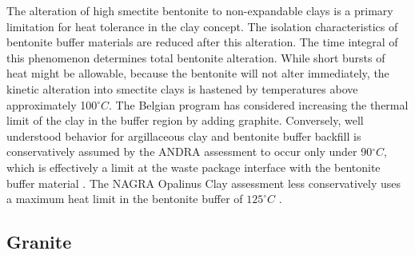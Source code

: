 \documentclass[letterpaper]{article}
\begin{document}
The alteration of high smectite bentonite to non-expandable clays is a primary 
limitation for heat tolerance in the clay concept. The isolation characteristics 
of bentonite buffer materials are reduced after this alteration. The time 
integral of this phenomenon determines total bentonite alteration. While short 
bursts of heat might be allowable, because the bentonite will not alter 
immediately, the kinetic alteration into smectite clays is hastened by 
temperatures above approximately 100$^{\circ}C$\cite{pusch_alteration_1987}. 
The Belgian program has considered increasing the thermal limit of the clay in
the buffer region by adding graphite.
Conversely, well understood behavior for argillaceous clay and bentonite buffer 
backfill
is conservatively assumed by the \gls{ANDRA} assessment to occur only under  
90$^{\circ}C$, which is effectively a limit at the waste package interface with 
the bentonite buffer material\cite{andra_argile:_2005} .
The \gls{NAGRA} Opalinus Clay assessment less conservatively 
uses a maximum heat limit in the bentonite buffer of $125^{\circ}C$
\cite{johnson_project_2002} .


% 


\subsection{Granite}
\label{subsec:granitethermal}
\end{document}
